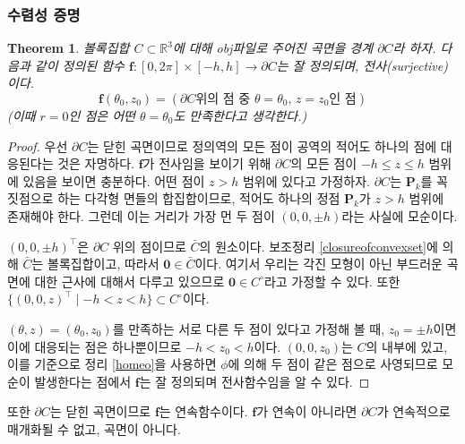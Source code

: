\documentclass{gshs_thesis}
\theoremstyle{theorem}
\newtheorem{theorem}{Theorem}[section]
\theoremstyle{lemma}
\theoremstyle{definition}
\begin{document}
\subsubsection{수렴성 증명}
\begin{theorem} \label{proj}
	볼록집합 $C \subset \mathbb{R}^3$에 대해 obj파일로 주어진 곡면을 경계 $\partial C$라 하자. 다음과 같이 정의된 함수 $\mathbf{f} \colon [0, 2\pi] \times [-h, h] \to \partial C$는 잘 정의되며, 전사(surjective)이다. 
	$$ \mathbf{f}(\theta_0, z_0) = (\partial C \text{위의 점 중 } \theta = \theta_0, \, z = z_0 \text{인 점}) $$
	(이때 $r=0$인 점은 어떤 $\theta = \theta_0$도 만족한다고 생각한다.)
\end{theorem}
\begin{proof}
	우선 $\partial C$는 닫힌 곡면이므로 정의역의 모든 점이 공역의 적어도 하나의 점에 대응된다는 것은 자명하다. $\mathbf{f}$가 전사임을 보이기 위해 $\partial C$의 모든 점이 $-h \leq z \leq h$ 범위에 있음을 보이면 충분하다. 어떤 점이 $z > h$ 범위에 있다고 가정하자. $\partial C$는 $\mathbf{P}_k$를 꼭짓점으로 하는 다각형 면들의 합집합이므로, 적어도 하나의 정점 $\mathbf{P}_k$가 $z > h$ 범위에 존재해야 한다. 그런데 이는 거리가 가장 먼 두 점이 $(0, 0, \pm h)$라는 사실에 모순이다. 
	
	$(0, 0, \pm h)^\intercal$은 $\partial C$ 위의 점이므로 $\bar{C}$의 원소이다. 보조정리 \ref{closureofconvexset}에 의해 $\bar{C}$는 볼록집합이고, 따라서 $\mathbf{0} \in \bar{C}$이다. 여기서 우리는 각진 모형이 아닌 부드러운 곡면에 대한 근사에 대해서 다루고 있으므로 $\mathbf{0} \in C^\circ$라고 가정할 수 있다. 또한 $\{ (0, 0, z)^\intercal \mid -h < z < h \} \subset C^\circ$이다. 
	
	  $(\theta, z) = (\theta_0, z_0)$를 만족하는 서로 다른 두 점이 있다고 가정해 볼 때, $z_0 = \pm h$이면 이에 대응되는 점은 하나뿐이므로 $-h < z_0 < h$이다. $(0, 0, z_0)$는 $C$의 내부에 있고, 이를 기준으로 정리 \ref{homeo}을 사용하면 $\phi$에 의해 두 점이 같은 점으로 사영되므로 모순이 발생한다는 점에서 $\mathbf{f}$는 잘 정의되며 전사함수임을 알 수 있다.
\end{proof}
또한 $\partial C$는 닫힌 곡면이므로 $\mathbf{f}$는 연속함수이다. $\mathbf{f}$가 연속이 아니라면 $\partial C$가 연속적으로 매개화될 수 없고, 곡면이 아니다. 
\end{document}
